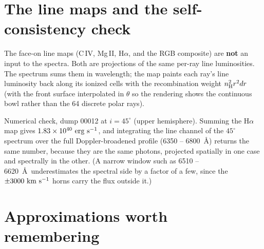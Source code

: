 \documentclass[11pt]{article}
\newcommand{\nH}{n_{\rm H}}
\begin{document}
\section{The line maps and the self-consistency check}

The face-on line maps (C\,IV, Mg\,II, H$\alpha$, and the RGB
composite) are \textbf{not} an input to the spectra. Both are
projections of the same per-ray line luminosities. The spectrum sums
them in wavelength; the map paints each ray's line luminosity back
along its ionized cells with the recombination weight
$\nH^2 r^2 dr$ (with the front surface interpolated in $\theta$ so the
rendering shows the continuous bowl rather than the 64 discrete polar
rays).

Numerical check, dump 00012 at $i=45^\circ$ (upper hemisphere).
Summing the H$\alpha$ map gives
$1.83\times10^{40}~{\rm erg~s^{-1}}$, and integrating the line channel
of the $45^\circ$ spectrum over the full Doppler-broadened profile
(6350 -- 6800~\AA) returns the same number, because they are the same
photons, projected spatially in one case and spectrally in the other.
(A narrow window such as 6510 -- 6620~\AA\ underestimates the
spectral side by a factor of a few, since the $\pm3000~{\rm
km~s^{-1}}$ horns carry the flux outside it.)

\section{Approximations worth remembering}
\end{document}
